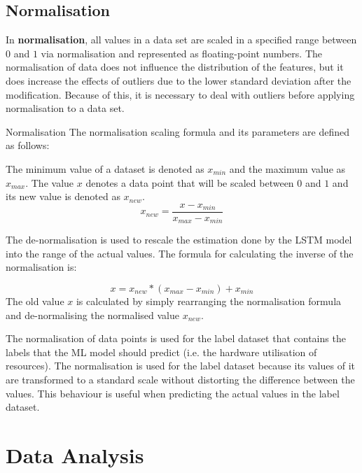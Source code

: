   \subsection{Normalisation}
  \label{sec:data-normalisation-data-preprocessing-architecture}

    In \textbf{normalisation}, all values in a data set are scaled in a specified range between $0$ and $1$ via normalisation and represented as floating-point numbers.
    The normalisation of data does not influence the distribution of the features, but it does increase the effects of outliers due to the lower standard deviation after the modification. Because of this, it is necessary to deal with outliers before applying normalisation to a data set.
    
    \begin{pabox}{Normalisation}
      \label{def:normalisation}
      The normalisation scaling formula and its parameters are defined as follows:

      The minimum value of a dataset is denoted as $x_{min}$ and the maximum value as $x_{max}$.
      The value $x$ denotes a data point that will be scaled between $0$ and $1$ and its new value is denoted as $x_{new}$.
      $$x_{new} = \frac{x - x_{min}}{x_{max} - x_{min}}$$

      The de-normalisation is used to rescale the estimation done by the LSTM model into the range of the actual values. The formula for calculating the inverse of the normalisation is:

      $$x = x_{new} * (x_{max} - x_{min}) + x_{min}$$
      The old value $x$ is calculated by simply rearranging the normalisation formula and de-normalising the normalised value $x_{new}$.
    \end{pabox}
    The normalisation of data points is used for the label dataset that contains the labels that the ML model should predict (i.e. the hardware utilisation of resources). The normalisation is used for the label dataset because its values of it are transformed to a standard scale without distorting the difference between the values. This behaviour is useful when predicting the actual values in the label dataset.




\section{Data Analysis}
\label{sec:data-preprocessing-and-analysis-architecture}
      
